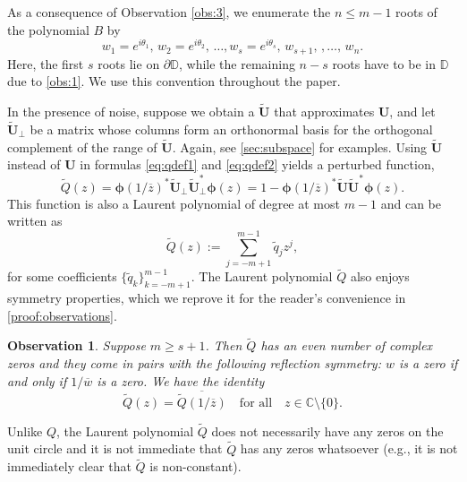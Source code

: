 \documentclass[11pt]{article}
\newtheorem{observation}[theorem]{Observation}
\theoremstyle{definition}
\numberwithin{theorem}{section}
\numberwithin{equation}{section}
\def\C{\mathbb{C}}
\def\D{\mathbb{D}}
\renewcommand{\tilde}{\widetilde}
\newcommand{\bfU}{{\boldsymbol U}}
\newcommand{\bfphi}{{\boldsymbol \phi}}
\def\forallspace{\quad\text{for all}\quad}
\numberwithin{equation}{section}
\begin{document}
As a consequence of Observation \ref{obs:3}, we enumerate the $n\leq m-1$ roots of the polynomial $B$ by 
\begin{equation}
	\label{eq:roots1}
	w_1=e^{i \theta_1}, \, w_2 = e^{i\theta_2}, \,  \dots, w_s=e^{i \theta_s}, \, w_{s+1}, \, ,\dots, \, w_n.
\end{equation}
Here, the first $s$ roots lie on $\partial\D$, while the remaining $n-s$ roots have to be in $\D$ due to \cref{obs:1}. We use this convention throughout the paper. 

In the presence of noise, suppose we obtain a $\tilde\bfU$ that approximates $\bfU$, and let $\tilde \bfU_\perp$ be a matrix whose columns form an orthonormal basis for the orthogonal complement of the range of $\tilde\bfU$. Again, see \cref{sec:subspace} for examples. Using $\tilde \bfU$ instead of $\bfU$ in formulas \eqref{eq:qdef1} and \eqref{eq:qdef2} yields a perturbed function,
\begin{equation}
    \tilde Q(z)
    =\bfphi(1/\overline z)^* \tilde \bfU_\perp \tilde \bfU_\perp^* \bfphi(z)
    =1 -\bfphi(1/\overline z)^* \tilde \bfU \tilde \bfU^* \bfphi(z). \label{eq:defQtilde1}
\end{equation}
This function is also a Laurent polynomial of degree at most $m-1$ and can be written as
\begin{equation}
    \label{eq:defQtilde2}
    \tilde Q(z):=\sum_{j=-m+1}^{m-1} \tilde q_j z^j,
\end{equation}
for some coefficients $\{\tilde q_k\}_{k=-m+1}^{m-1}$. The Laurent polynomial $\tilde Q$ also enjoys symmetry properties, which we reprove it for the reader's convenience in \cref{proof:observations}.


\begin{observation}
	\label{obs:4}
	Suppose $m\geq s+1$. Then $\tilde Q$ has an even number of complex zeros and they come in pairs with the following reflection symmetry: $w$ is a zero if and only if $1/\overline{w}$ is a zero. We have the identity 
    $$
    \tilde Q(z)=\overline{\tilde Q(1/\overline z)} \forallspace z\in \C\setminus \{0\}.
    $$
\end{observation}

Unlike $Q$, the Laurent polynomial $\tilde Q$ does not necessarily have any zeros on the unit circle and it is not immediate that $\tilde Q$ has any zeros whatsoever (e.g., it is not immediately clear that $\tilde Q$ is non-constant). 
\end{document}
